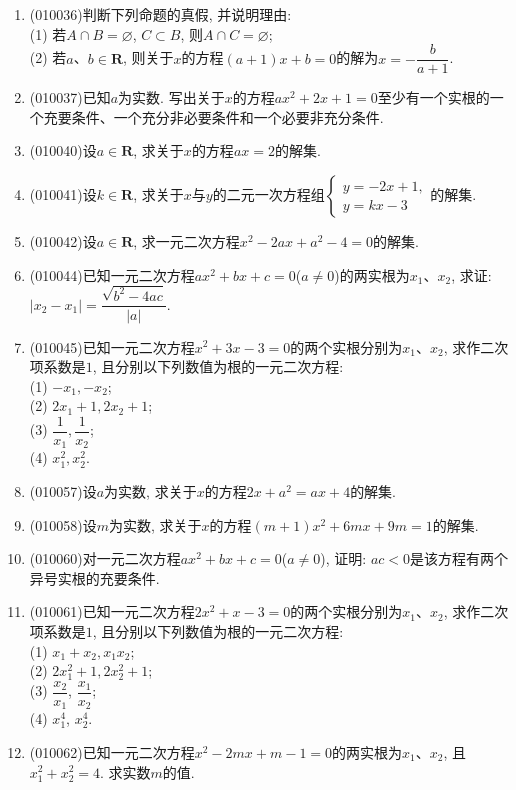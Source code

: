\documentclass[10pt,a4paper]{article}
\begin{document}
\begin{enumerate}[1.]
\item {\tiny (010036)}判断下列命题的真假, 并说明理由:\\
(1) 若$A\cap B=\varnothing$, $C\subset B$, 则$A\cap C=\varnothing$;\\
(2) 若$a$、$b\in \mathbf{R}$, 则关于$x$的方程$(a+1)x+b=0$的解为$x=- \dfrac b{a+1}$.
\item {\tiny (010037)}已知$a$为实数. 写出关于$x$的方程$ax^2+2x+1=0$至少有一个实根的一个充要条件、一个充分非必要条件和一个必要非充分条件.
\item {\tiny (010040)}设$a\in \mathbf{R}$, 求关于$x$的方程$ax=2$的解集.
\item {\tiny (010041)}设$k\in \mathbf{R}$, 求关于$x$与$y$的二元一次方程组$\begin{cases}y=-2x+1,\\  y=kx-3\end{cases}$的解集.
\item {\tiny (010042)}设$a\in \mathbf{R}$, 求一元二次方程$x^2-2ax+a^2-4=0$的解集.
\item {\tiny (010044)}已知一元二次方程$ax^2+bx+c=0$($a\ne 0$)的两实根为$x_1$、$x_2$, 求证: $|x_2-x_1| = \dfrac{\sqrt{b^2-4 ac}}{|a|}$.
\item {\tiny (010045)}已知一元二次方程$x^2+3x-3=0$的两个实根分别为$x_1$、$x_2$, 求作二次项系数是$1$, 且分别以下列数值为根的一元二次方程:\\
(1) $-x_1, -x_2$;\\
(2) $2x_1+1, 2x_2+1$;\\
(3) $\dfrac 1{x_1}, \dfrac 1{x_2}$;\\
(4) $x_1^2, x_2^2$.
\item {\tiny (010057)}设$a$为实数, 求关于$x$的方程$2x+a^2=ax+4$的解集.
\item {\tiny (010058)}设$m$为实数, 求关于$x$的方程$(m+1)x^2+6mx+9m=1$的解集.
\item {\tiny (010060)}对一元二次方程$ax^2+bx+c=0$($a\ne 0$), 证明: $ac<0$是该方程有两个异号实根的充要条件.
\item {\tiny (010061)}已知一元二次方程$2x^2+x-3=0$的两个实根分别为$x_1$、$x_2$, 求作二次项系数是$1$, 且分别以下列数值为根的一元二次方程:\\
(1) $x_1+x_2, x_1x_2$;\\
(2) $2x_1^2+1, 2x_2^2+1$;\\
(3) $\dfrac{x_2}{x_1}$, $\dfrac{x_1}{x_2}$;\\
(4) $x_1^4$, $x_2^4$.
\item {\tiny (010062)}已知一元二次方程$x^2-2mx+m-1=0$的两实根为$x_1$、$x_2$, 且$x_1^2+x_2^2=4$. 求实数$m$的值.

\end{enumerate}
\end{document}
